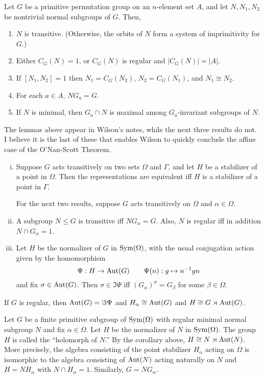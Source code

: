 Let $G$ be a primitive permutation group on an $n$-element set $A$, 
and let $N, N_1, N_2$ be nontrivial normal subgroups of $G$.  Then,
\begin{enumerate}
\item $N$ is transitive. (Otherwise, the orbits of $N$ form a system of
  imprimitivity for $G$.)
\item Either $C_G(N) = 1$, or $C_G(N)$ is regular and $|C_G(N)| = |A|$.
\item If $[N_1, N_2] = 1$ then $N_1 = C_G(N_2)$, $N_2 = C_G(N_1)$, and $N_1
  \cong N_2$.
\item For each $a\in A$, $NG_a = G$.
\item If $N$ is minimal, then $G_a\cap N$ is maximal among $G_a$-invariant
  subgroups of $N$.
\end{enumerate}

The lemmas above appear in Wilson's notes, while the next three results do
not. I believe it is the last of these that enables Wilson to quickly conclude
the affine case of the O'Nan-Scott Theorem. 

\begin{enumerate}[(i)]
\item Suppose $G$ acts transitively on two sets $\Omega$ and $\Gamma$,
and let $H$ be a stabilizer of a point in $\Omega$. Then the representations are
equivalent iff $H$ is a stabilizer of a point in $\Gamma$.

For the next two results, suppose $G$ acts transitively on $\Omega$ and $\alpha \in
\Omega$.

\item A subgroup $N\leq G$ is transitive iff $NG_\alpha = G$.
Also, $N$ is regular iff in addition $N \cap G_\alpha = 1$.

\item Let $H$ be the normalizer of $G$ in $\operatorname{Sym}(\Omega)$, with the usual conjugation
action given by the homomorphism
\[
\Psi : H \rightarrow \operatorname{Aut}(G) \qquad \Psi(n): g \mapsto n^{-1} g n
\]
and fix $\sigma \in \operatorname{Aut}(G)$.  Then
$\sigma \in \Im \Psi$ iff $(G_\alpha)^\sigma = G_\beta$ for some $\beta \in \Omega$.
\end{enumerate}

\begin{corollary}
If $G$ is regular, then $\operatorname{Aut}(G) = \Im \Psi$ and $H_\alpha \cong \operatorname{Aut}(G)$ and $H \cong G \rtimes \operatorname{Aut}(G)$.
\end{corollary}

Let $G$ be a finite primitive subgroup of $\operatorname{Sym}(\Omega)$ with regular minimal normal
subgroup $N$ and fix $\alpha \in \Omega$.  Let $H$ be the normalizer of $N$ in $\operatorname{Sym}(\Omega)$.  
The group $H$ is called the ``holomorph of $N$.'' By the corollary above, $H \cong
N\rtimes \operatorname{Aut}(N)$.  More precisely, the algebra consisting of the point stabilizer $H_\alpha$ acting on
$\Omega$ is isomorphic to the algebra consisting of $\operatorname{Aut}(N)$ acting naturally
on $N$ and $H = N H_\alpha$ with $N\cap H_\alpha = 1$.  Similarly, $G = NG_\alpha$.


